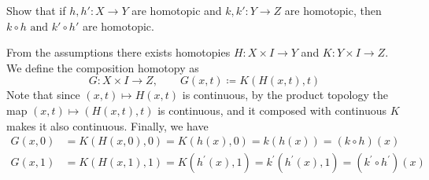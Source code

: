   \begin{exercise}[Munkres 51.1]
    Show that if $h, h' : X \to Y$ are homotopic and $k, k' : Y \to Z$ are homotopic, then $k \circ h \text{ and } k' \circ h'$ are homotopic.
  \end{exercise}
  \begin{solution}
    From the assumptions there exists homotopies $H: X \times I \rightarrow Y$ and $K: Y \times I \rightarrow Z$. We define the composition homotopy as 
    \begin{equation}
      G: X \times I \rightarrow Z, \qquad G(x, t) \coloneqq K(H(x, t), t)
    \end{equation}
    Note that since $(x, t) \mapsto H(x, t)$ is continuous, by the product topology the map $(x, t) \mapsto (H(x, t), t)$ is continuous, and it composed with continuous $K$ makes it also continuous. Finally, we have 
    \begin{align}
      G(x, 0) & = K(H(x, 0), 0) = K(h(x), 0) = k(h(x)) = (k \circ h) (x) \\ 
      G(x, 1) & = K(H(x, 1), 1) = K(h^\prime (x), 1) = k^\prime (h^\prime (x), 1) = (k^\prime \circ h^\prime) (x)
    \end{align}
  \end{solution}

